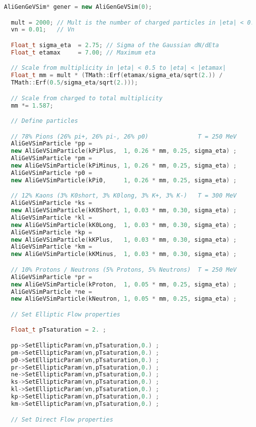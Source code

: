 \documentclass[12pt,a4paper,twoside]{article}
\begin{document}
\begin{lstlisting}[language=C++]
  AliGenGeVSim* gener = new AliGenGeVSim(0);

  mult = 2000; // Mult is the number of charged particles in |eta| < 0.5
  vn = 0.01;   // Vn

  Float_t sigma_eta  = 2.75; // Sigma of the Gaussian dN/dEta
  Float_t etamax     = 7.00; // Maximum eta

  // Scale from multiplicity in |eta| < 0.5 to |eta| < |etamax|	
  Float_t mm = mult * (TMath::Erf(etamax/sigma_eta/sqrt(2.)) /
  TMath::Erf(0.5/sigma_eta/sqrt(2.))); 

  // Scale from charged to total multiplicity
  mm *= 1.587;

  // Define particles

  // 78% Pions (26% pi+, 26% pi-, 26% p0)              T = 250 MeV
  AliGeVSimParticle *pp =  
  new AliGeVSimParticle(kPiPlus,  1, 0.26 * mm, 0.25, sigma_eta) ;
  AliGeVSimParticle *pm =  
  new AliGeVSimParticle(kPiMinus, 1, 0.26 * mm, 0.25, sigma_eta) ;
  AliGeVSimParticle *p0 =  
  new AliGeVSimParticle(kPi0,     1, 0.26 * mm, 0.25, sigma_eta) ;

  // 12% Kaons (3% K0short, 3% K0long, 3% K+, 3% K-)   T = 300 MeV
  AliGeVSimParticle *ks =  
  new AliGeVSimParticle(kK0Short, 1, 0.03 * mm, 0.30, sigma_eta) ;
  AliGeVSimParticle *kl =
  new AliGeVSimParticle(kK0Long,  1, 0.03 * mm, 0.30, sigma_eta) ;
  AliGeVSimParticle *kp =
  new AliGeVSimParticle(kKPlus,   1, 0.03 * mm, 0.30, sigma_eta) ;
  AliGeVSimParticle *km =
  new AliGeVSimParticle(kKMinus,  1, 0.03 * mm, 0.30, sigma_eta) ;

  // 10% Protons / Neutrons (5% Protons, 5% Neutrons)  T = 250 MeV
  AliGeVSimParticle *pr =
  new AliGeVSimParticle(kProton,  1, 0.05 * mm, 0.25, sigma_eta) ;
  AliGeVSimParticle *ne =
  new AliGeVSimParticle(kNeutron, 1, 0.05 * mm, 0.25, sigma_eta) ;

  // Set Elliptic Flow properties 	

  Float_t pTsaturation = 2. ;

  pp->SetEllipticParam(vn,pTsaturation,0.) ;
  pm->SetEllipticParam(vn,pTsaturation,0.) ;
  p0->SetEllipticParam(vn,pTsaturation,0.) ;
  pr->SetEllipticParam(vn,pTsaturation,0.) ;
  ne->SetEllipticParam(vn,pTsaturation,0.) ;
  ks->SetEllipticParam(vn,pTsaturation,0.) ;
  kl->SetEllipticParam(vn,pTsaturation,0.) ;
  kp->SetEllipticParam(vn,pTsaturation,0.) ;
  km->SetEllipticParam(vn,pTsaturation,0.) ;

  // Set Direct Flow properties	


\end{lstlisting}
\end{document}
